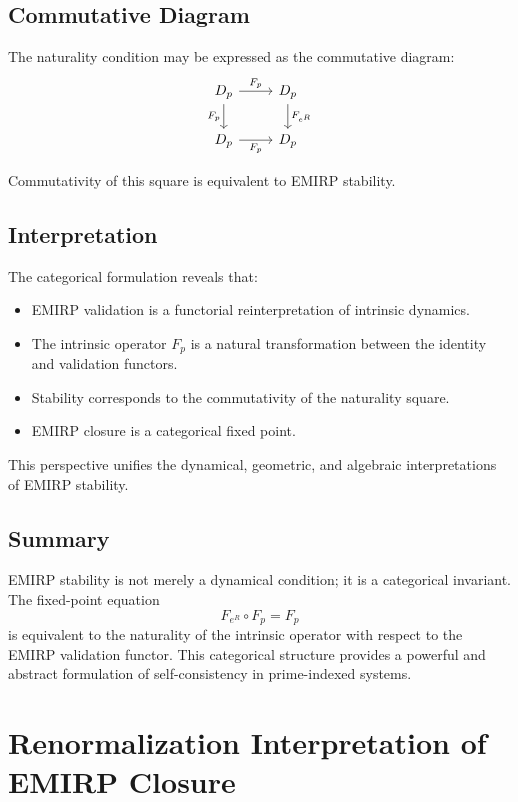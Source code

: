 \documentclass[11pt]{article}
\theoremstyle{definition}
\theoremstyle{plain}
\theoremstyle{remark}
\begin{document}
\subsection{Commutative Diagram}

The naturality condition may be expressed as the commutative diagram:
\[
\begin{tikzcd}
D_p \arrow[r,"F_p"] \arrow[d,"F_p"'] &
D_p \arrow[d,"F_{e^R}"] \\
D_p \arrow[r,"F_p"'] &
D_p
\end{tikzcd}
\]

Commutativity of this square is equivalent to EMIRP stability.

\subsection{Interpretation}

The categorical formulation reveals that:

\begin{itemize}
    \item EMIRP validation is a functorial reinterpretation of intrinsic dynamics.
    \item The intrinsic operator $F_p$ is a natural transformation between
    the identity and validation functors.
    \item Stability corresponds to the commutativity of the naturality square.
    \item EMIRP closure is a categorical fixed point.
\end{itemize}

This perspective unifies the dynamical, geometric, and algebraic
interpretations of EMIRP stability.

\subsection{Summary}

EMIRP stability is not merely a dynamical condition; it is a categorical
invariant. The fixed-point equation
\[
F_{e^R} \circ F_p = F_p
\]
is equivalent to the naturality of the intrinsic operator with respect
to the EMIRP validation functor. This categorical structure provides a
powerful and abstract formulation of self-consistency in prime-indexed
systems.

\section{Renormalization Interpretation of EMIRP Closure}
\end{document}
